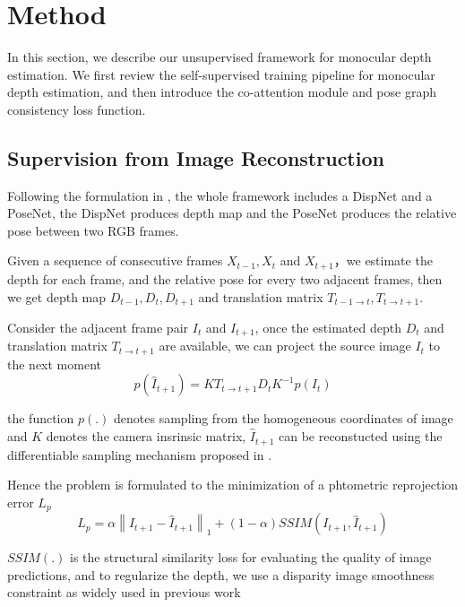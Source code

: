 \section{Method}
In this section, we describe our unsupervised framework for monocular depth estimation. We first review the self-supervised training pipeline for monocular depth estimation, and then introduce the co-attention module and pose graph consistency loss function.

\subsection{Supervision from Image Reconstruction}
Following the formulation in \cite{zhou_unsupervised_2017}, the whole framework includes a DispNet and a PoseNet, the DispNet produces depth map and the PoseNet produces the relative pose between two RGB frames.

Given a sequence of consecutive frames $X_{t-1}, X_t$ and $X_{t+1}$，we estimate the depth for each frame, and the relative pose for every two adjacent frames, then we get depth map $D_{t-1}, D_t, D_{t+1}$ and translation matrix $T_{t-1\rightarrow t}, T_{t\rightarrow t+1}$.

Consider the adjacent frame pair $I_t$ and $I_{t+1}$, once the estimated depth $D_t$ and translation matrix $T_{t\rightarrow t+1}$ are available, we can project the source image $I_t$ to the next moment
\begin{equation}
  \label{projection}
  p(\hat{I}_{t+1}) = KT_{t\rightarrow t+1}D_tK^{-1}p(I_t)
\end{equation}

the function $p(.)$ denotes sampling from the homogeneous coordinates of image and $K$ denotes the camera insrinsic matrix, $\hat{I}_{t+1}$ can be reconstucted using the differentiable sampling mechanism proposed in \cite{jaderberg_spatial_2015}.

Hence the problem is formulated to the minimization of a phtometric reprojection error $L_p$
\begin{equation}
  \label{photometric error}
  L_p = \alpha \left\|I_{t+1} - \hat{I}_{t+1}\right\|_1 + (1 - \alpha)SSIM(I_{t+1}, \hat{I}_{t+1})
\end{equation}

$SSIM(.)$ is the structural similarity\cite{wang_image_2004} loss for evaluating the quality of image predictions, and to regularize the depth, we use a disparity image smoothness constraint as widely used in previous work\cite{mahjourian_unsupervised_2018,zhou_unsupervised_2017,garg_unsupervised_2016}

